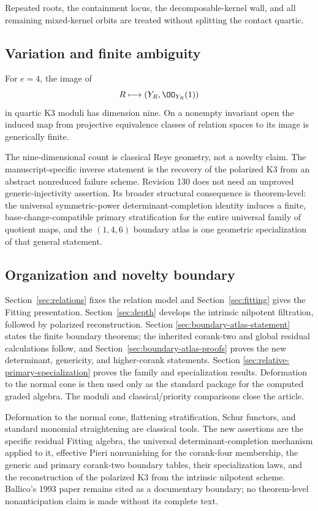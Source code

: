 Repeated roots, the containment locus, the decomposable-kernel wall,
and all remaining mixed-kernel orbits are treated without splitting
the contact quartic.

\subsection{Variation and finite ambiguity}

\begin{theorem}
\label{thm:main-moduli}
For \(e=4\), the image of
\[
 R\longmapsto(Y_R,\OO_{Y_R}(1))
\]
in quartic K3 moduli has dimension nine.  On a nonempty invariant
open the induced map from projective equivalence classes of relation
spaces to its image is generically finite.
\end{theorem}

The nine-dimensional count is classical Reye geometry, not a novelty
claim.  The manuscript-specific inverse statement is the recovery of
the polarized K3 from an abstract nonreduced failure scheme.  Revision 130 does not need an unproved generic-injectivity assertion.  Its broader structural consequence is theorem-level: the universal symmetric-power determinant-completion identity induces a finite, base-change-compatible primary stratification for the entire universal family of quotient maps, and the \((1,4,6)\) boundary atlas is one geometric specialization of that general statement.

\subsection{Organization and novelty boundary}

Section~\ref{sec:relations} fixes the relation model and
Section~\ref{sec:fitting} gives the Fitting presentation.
Section~\ref{sec:depth} develops the intrinsic nilpotent filtration,
followed by polarized reconstruction.  Section
\ref{sec:boundary-atlas-statement} states the finite boundary theorems;
the inherited corank-two and global residual calculations follow, and
Section~\ref{sec:boundary-atlas-proofs} proves the new determinant,
genericity, and higher-corank statements.  Section
\ref{sec:relative-primary-specialization} proves the family and
specialization results.  Deformation to the normal cone is then used
only as the standard package for the computed graded algebra.  The
moduli and classical/priority comparisons close the article.

Deformation to the normal cone, flattening stratification, Schur
functors, and standard monomial straightening are classical tools.
The new assertions are the specific residual Fitting algebra, the
universal determinant-completion mechanism applied to it, effective
Pieri nonvanishing for the corank-four membership, the generic and
primary corank-two boundary tables, their specialization laws, and
the reconstruction of the polarized K3 from the intrinsic nilpotent
scheme.  Ballico's 1993 paper remains cited as a documentary boundary;
no theorem-level nonanticipation claim is made without its complete
text.
